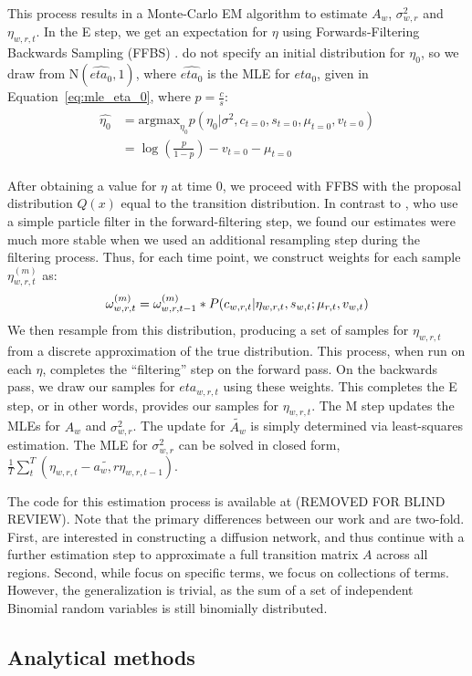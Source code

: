 This process results in a Monte-Carlo EM algorithm to estimate $A_{w}$, $\sigma^2_{w,r}$ and $\eta_{w,r,t}$.  In the E step, we get an expectation for $\eta$ using Forwards-Filtering Backwards Sampling (FFBS) \cite{} . \cite{eisenstein_diffusion_2014} do not specify an initial distribution for $\eta_0$, so we draw from $\mathrm{N}(\hat{eta_0}, 1)$, where $\hat{eta_0}$ is the MLE for $eta_0$, given in Equation~\ref{eq:mle_eta_0}, where $p=\frac{c}{s}$:
\begin{align} 
\begin{split}
	\hat{\eta_0} &= \text{argmax}_{\eta_0}  p(\eta_0 | \sigma^2, c_{t=0},s_{t=0}, \mu_{t=0}, v_{t=0}) \\
	&= \log(\frac{p}{1-p}) -v_{t=0} -  \mu_{t=0}  \label{eq:mle_eta_0}
	\end{split}
\end{align}

After obtaining a value for $\eta$ at time 0, we proceed with FFBS with the proposal distribution $Q(x)$ equal to the transition distribution. In contrast to \cite{eisenstein_diffusion_2014}, who use a simple particle filter in the forward-filtering step, we found our estimates were much more stable when we used an additional resampling step during the filtering process. Thus, for each time point, we construct weights for each sample $\eta_{w,r,t}^{(m)}$ as:
\begin{equation} 
\omega_{w,r,t}^{(m)} = \omega_{w,r,t-1}^{(m)} * P(c_{w,r,t} | \eta_{w,r,t}, s_{w,t}; \mu_{r,t}, v_{w,t}) \\
\end{equation}
We then resample from this distribution, producing a set of samples for $\eta_{w,r,t}$ from a discrete approximation of the true distribution. This process, when run on each $\eta$, completes the ``filtering'' step on the forward pass.  On the backwards pass, we draw our samples for $eta_{w,r,t}$ using these weights.  This completes the E step, or in other words, provides our samples for $\eta_{w,r,t}$. The M step updates the MLEs for $A_w$ and $\sigma^2_{w,r}$. The update for $\tilde{A_w}$ is simply determined via least-squares estimation. The MLE for $\sigma^2_{w,r}$ can be solved in closed form, $\frac{1}{T}\sum_t^T(\eta_{w,r,t} - \tilde{a_w,r}\eta_{w,r,t-1})$.

The code for this estimation process is available at (REMOVED FOR BLIND REVIEW).  Note that the primary differences between our work and \cite{eisenstein_diffusion_2014} are two-fold. First, \cite{eisenstein_diffusion_2014} are interested in constructing a diffusion network, and thus continue with a further estimation step to approximate a full transition matrix $A$ across all regions.  Second, while \cite{eisenstein_diffusion_2014} focus on specific terms, we focus on collections of terms. However, the generalization is trivial, as the sum of a set of independent Binomial random variables is still binomially distributed.


\subsection{Analytical methods}
	